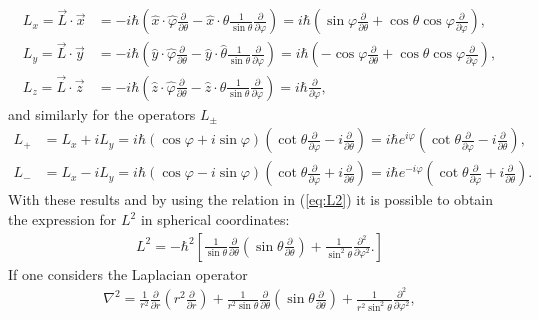 \begin{align*}
    L_x = \vec{L} \cdot \vec{x} &= -i \hbar \left( \hat{x} \cdot \hat{\varphi} \frac{\partial}{\partial \theta} - \hat{x} \cdot \hat{\theta} \frac{1}{\sin{\theta}} \frac{\partial}{\partial \varphi}\right) = i\hbar \left( \sin{\varphi} \frac{\partial}{\partial \theta} + \cos{\theta} \cos{\varphi} \frac{\partial}{\partial \varphi} \right), \\
    L_y = \vec{L} \cdot \vec{y} &= -i \hbar \left( \hat{y} \cdot \hat{\varphi} \frac{\partial}{\partial \theta} - \hat{y} \cdot \hat{\theta} \frac{1}{\sin{\theta}} \frac{\partial}{\partial \varphi}\right) = i\hbar \left( -\cos{\varphi} \frac{\partial}{\partial \theta} + \cos{\theta} \cos{\varphi}  \frac{\partial}{\partial \varphi} \right), \\
    L_z = \vec{L} \cdot \vec{z} &= -i \hbar \left( \hat{z} \cdot \hat{\varphi} \frac{\partial}{\partial \theta} - \hat{z} \cdot \hat{\theta} \frac{1}{\sin{\theta}} \frac{\partial}{\partial \varphi}\right) = i\hbar \frac{\partial}{\partial \varphi},
\end{align*}
and similarly for the operators $L_\pm$
\begin{align*}
    L_+ &= L_x + i L_y = i \hbar (\cos{\varphi} + i \sin{\varphi}) \left( \cot{\theta} \frac{\partial}{\partial \varphi} -i \frac{\partial}{\partial \theta} \right) = i\hbar e^{i \varphi} \left( \cot{\theta} \frac{\partial}{\partial \varphi} -i \frac{\partial}{\partial \theta} \right), \\
    L_- &= L_x - i L_y = i \hbar (\cos{\varphi} - i \sin{\varphi}) \left( \cot{\theta} \frac{\partial}{\partial \varphi}+ i \frac{\partial}{\partial \theta} \right) = i\hbar e^{-i \varphi} \left( \cot{\theta} \frac{\partial}{\partial \varphi}+i \frac{\partial}{\partial \theta} \right).
\end{align*}
With these results and by using the relation in (\ref{eq:L2}) it is possible to obtain the expression for $L^2$ in spherical coordinates:
\begin{align*}
    L^2 = -\hbar^2 \left[\frac{1}{\sin{\theta}} \frac{\partial}{\partial \theta} \left( \sin{\theta} \frac{\partial}{\partial \theta} \right) + \frac{1}{\sin^2{\theta}} \frac{\partial^2}{\partial \varphi^2}.  \right]
\end{align*}
If one considers the Laplacian operator
\begin{align}
   \nabla^2 = \frac{1}{r^2} \frac{\partial}{\partial r} \left( r^2 \frac{\partial}{\partial r}\right) + \frac{1}{r^2 \sin{\theta}}  \frac{\partial}{\partial \theta}  \left( \sin{\theta} \frac{\partial}{\partial \theta} \right) + \frac{1}{r^2 \sin^2{\theta}} \frac{\partial^2}{\partial\varphi^2},
   \label{eq:laplacian_spher}
\end{align}
